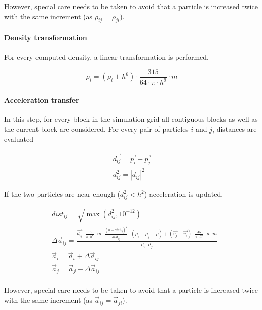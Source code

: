However, special care needs to be taken to avoid that a particle is increased twice
with the same increment (as $\rho_{ij} = \rho_{ji}$).


\paragraph{Density transformation}
For every computed density, a linear transformation is performed.

\[
\rho_i = (\rho_i + h^6) \cdot \frac{315}{64 \cdot \pi \cdot h^9} \cdot m
\]

\paragraph{Acceleration transfer}
In this step, for every block in the simulation grid all contiguous blocks as
well as the current block are considered. For every pair of particles $i$ and
$j$, distances are evaluated

\[
\begin{split}
\vec{d_{ij}} = \vec{p_i} - \vec{p_j} \\
d_{ij}^2 = | d_{ij} |^2
\end{split}
\]

If the two particles are near enough ($d_{ij}^2 < h^2$) acceleration is updated.

\[
\begin{split}
& dist_{ij} = \sqrt{\max(d_{ij}^2, 10^{-12})} \\
& \Delta \vec{a}_{ij} = 
  \frac{
    \vec{d_{ij}} \cdot \frac{15}{\pi \cdot h^6} \cdot m \cdot 
    \frac{(h - dist_{ij})^2}{dist_{ij}^2} \cdot (\rho_i + \rho_j - \rho) +
    (\vec{v_j} - \vec{v_i}) \cdot \frac{45}{\pi \cdot h^6} \cdot \mu \cdot m
  }{
    \rho_i \cdot \rho_j    
  } \\
& \vec{a}_i = \vec{a}_i + \Delta \vec{a}_{ij}\\
& \vec{a}_j = \vec{a}_j - \Delta \vec{a}_{ij}\\
\end{split}
\]

However, special care needs to be taken to avoid that a particle is increased twice
with the same increment (as $\vec{a}_{ij} = \vec{a}_{ji}$).
